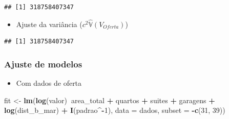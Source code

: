 \documentclass{article}
\newenvironment{Shaded}{\begin{snugshade}}{\end{snugshade}}
\newcommand{\DataTypeTok}[1]{\textcolor[rgb]{0.13,0.29,0.53}{#1}}
\newcommand{\DecValTok}[1]{\textcolor[rgb]{0.00,0.00,0.81}{#1}}
\newcommand{\FloatTok}[1]{\textcolor[rgb]{0.00,0.00,0.81}{#1}}
\newcommand{\KeywordTok}[1]{\textcolor[rgb]{0.13,0.29,0.53}{\textbf{#1}}}
\newcommand{\NormalTok}[1]{#1}
\newcommand{\OperatorTok}[1]{\textcolor[rgb]{0.81,0.36,0.00}{\textbf{#1}}}
\newcommand{\OtherTok}[1]{\textcolor[rgb]{0.56,0.35,0.01}{#1}}
\newcommand{\StringTok}[1]{\textcolor[rgb]{0.31,0.60,0.02}{#1}}
\begin{document}
\begin{Shaded}
\end{Shaded}

\begin{verbatim}
## [1] 318758407347
\end{verbatim}

\begin{itemize}
\tightlist
\item
  Ajuste da variância (\(c^2 \hat{\mathbb{V}}(V_{Oferta})\))
\end{itemize}

\begin{Shaded}
\end{Shaded}

\begin{verbatim}
## [1] 318758407347
\end{verbatim}

\hypertarget{ajuste-de-modelos}{%
\subsubsection{Ajuste de modelos}\label{ajuste-de-modelos}}

\begin{itemize}
\tightlist
\item
  Com dados de oferta
\end{itemize}

\begin{Shaded}
\begin{Highlighting}[]
\NormalTok{fit <-}\StringTok{ }\KeywordTok{lm}\NormalTok{(}\KeywordTok{log}\NormalTok{(valor)}\OperatorTok{~}\NormalTok{area_total }\OperatorTok{+}\StringTok{ }\NormalTok{quartos }\OperatorTok{+}\StringTok{ }\NormalTok{suites }\OperatorTok{+}\StringTok{ }\NormalTok{garagens }\OperatorTok{+}\StringTok{ }
\StringTok{            }\KeywordTok{log}\NormalTok{(dist_b_mar) }\OperatorTok{+}\StringTok{ }\KeywordTok{I}\NormalTok{(padrao}\OperatorTok{^-}\DecValTok{1}\NormalTok{), }\DataTypeTok{data =}\NormalTok{ dados, }\DataTypeTok{subset =} \OperatorTok{-}\KeywordTok{c}\NormalTok{(}\DecValTok{31}\NormalTok{, }\DecValTok{39}\NormalTok{))}
\end{Highlighting}
\end{Shaded}
\end{document}

